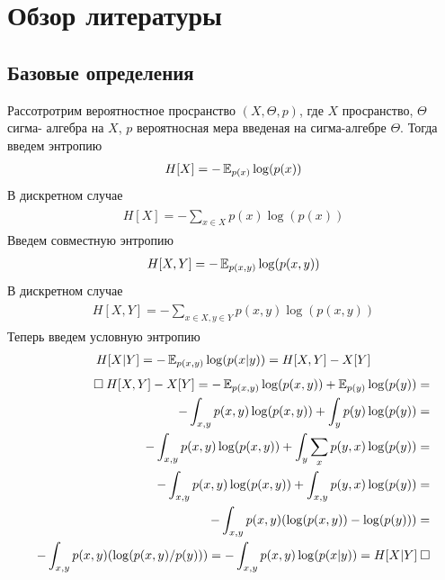 
\section{Обзор литературы}
\subsection{Базовые определения}
Рассотротрим вероятностное просранство $(X, \Theta, p)$, где $X$ просранство, $\Theta$ сигма- алгебра на $X$, $p$ вероятносная мера введеная на сигма-алгебре $\Theta$.
Тогда введем энтропию
\begin{gather}
\begin{aligned}  
H[X] = - \operatorname{\mathbb{E}}_{p(x)}\log(p(x))
\end{aligned}
\end{gather}
В дискретном случае
\begin{gather}
\begin{aligned}  
H[X] = - \sum_{x \in X}p(x)\log(p(x))
\end{aligned}
\end{gather}
Введем совместную энтропию
\begin{gather}
\begin{aligned}  
H[X, Y] = - \operatorname{\mathbb{E}}_{p(x, y)}\log(p(x, y))
\end{aligned}
\end{gather}
В дискретном случае
\begin{gather}
\begin{aligned}  
H[X, Y] = - \sum_{x \in X, y \in Y}p(x, y)\log(p(x, y))
\end{aligned}
\end{gather}
Теперь введем условную энтропию
\begin{gather}
\begin{aligned}  
    H[X | Y] = - \operatorname{\mathbb{E}}_{p(x, y)}\log(p(x | y)) = H[X, Y] - X[Y] \\
\end{aligned}
\end{gather}
\begin{gather}
\begin{aligned}
    \Box \: H[X, Y] - X[Y] = - \operatorname{\mathbb{E}}_{p(x, y)}\log(p(x, y)) + \operatorname{\mathbb{E}}_{p(y)}\log(p(y)) =  \\
    - \int_{x, y}p(x, y)\log(p(x, y)) + \int_{y}p(y)\log(p(y)) = \\
    - \int_{x, y}p(x, y)\log(p(x, y)) + \int_{y}\sum_{x}p(y, x)\log(p(y)) = \\ 
    - \int_{x, y}p(x, y)\log(p(x, y)) + \int_{x, y}p(y, x)\log(p(y)) = \\ 
    - \int_{x, y}p(x, y)(\log(p(x, y)) - \log(p(y))) = \\ 
    - \int_{x, y}p(x, y)(\log(p(x, y) / p(y))) = - \int_{x, y}p(x, y)\log(p(x | y)) = H[X | Y] \:\Box
\end{aligned}
\end{gather}    

